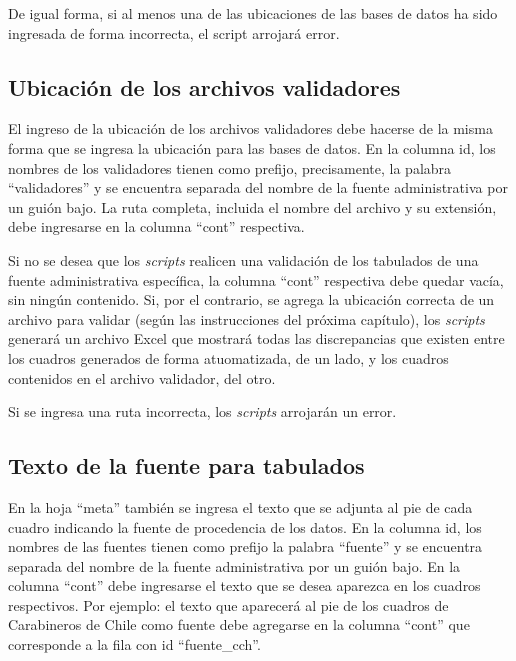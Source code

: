 \documentclass[
  spanish,
]{book}
\begin{document}
De igual forma, si al menos una de las ubicaciones de las bases de datos ha sido ingresada de forma incorrecta, el script arrojará error.

\hypertarget{ubicaciuxf3n-de-los-archivos-validadores}{%
\subsection{Ubicación de los archivos validadores}\label{ubicaciuxf3n-de-los-archivos-validadores}}

El ingreso de la ubicación de los archivos validadores debe hacerse de la misma forma que se ingresa la ubicación para las bases de datos. En la columna id, los nombres de los validadores tienen como prefijo, precisamente, la palabra ``validadores'' y se encuentra separada del nombre de la fuente administrativa por un guión bajo. La ruta completa, incluida el nombre del archivo y su extensión, debe ingresarse en la columna ``cont'' respectiva.

Si no se desea que los \emph{scripts} realicen una validación de los tabulados de una fuente administrativa específica, la columna ``cont'' respectiva debe quedar vacía, sin ningún contenido. Si, por el contrario, se agrega la ubicación correcta de un archivo para validar (según las instrucciones del próxima capítulo), los \emph{scripts} generará un archivo Excel que mostrará todas las discrepancias que existen entre los cuadros generados de forma atuomatizada, de un lado, y los cuadros contenidos en el archivo validador, del otro.

Si se ingresa una ruta incorrecta, los \emph{scripts} arrojarán un error.

\hypertarget{texto-de-la-fuente-para-tabulados}{%
\subsection{Texto de la fuente para tabulados}\label{texto-de-la-fuente-para-tabulados}}

En la hoja ``meta'' también se ingresa el texto que se adjunta al pie de cada cuadro indicando la fuente de procedencia de los datos. En la columna id, los nombres de las fuentes tienen como prefijo la palabra ``fuente'' y se encuentra separada del nombre de la fuente administrativa por un guión bajo. En la columna ``cont'' debe ingresarse el texto que se desea aparezca en los cuadros respectivos. Por ejemplo: el texto que aparecerá al pie de los cuadros de Carabineros de Chile como fuente debe agregarse en la columna ``cont'' que corresponde a la fila con id ``fuente\_cch''.
\end{document}

